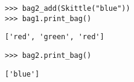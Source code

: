 \begin{lstlisting}
>>> bag2_add(Skittle("blue"))
>>> bag1.print_bag()
\end{lstlisting}
\begin{solution}[.2in]
\begin{lstlisting}
['red', 'green', 'red']
\end{lstlisting}
\end{solution}

\begin{lstlisting}
>>> bag2.print_bag()
\end{lstlisting}
\begin{solution}[.2in]
\begin{lstlisting}
['blue']
\end{lstlisting}
\end{solution}
